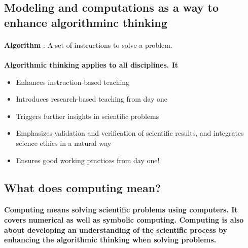 \documentclass[%
twoside,                 %
final,                   %
10pt]{article}
\begin{document}
\noindent



\subsection{Modeling and computations as a way to enhance algorithminc thinking}


\paragraph{}
\textbf{Algorithm} :
A set of instructions to solve a problem.




\paragraph{}
\textbf{Algorithmic thinking applies to all disciplines. It}
\begin{itemize}
\item Enhances instruction-based teaching

\item Introduces research-based teaching  from day one

\item Triggers further insights in scientific problems

\item Emphasizes validation and verification of scientific results, and integrates science ethics in a natural way

\item Ensures good working practices from day one!
\end{itemize}

\noindent





\subsection{What does computing mean?}


\paragraph{}

\textbf{Computing means solving scientific problems using computers. It covers numerical as well as symbolic computing. Computing is also about developing an understanding of the scientific process by enhancing the algorithmic thinking when solving problems.}
\end{document}
